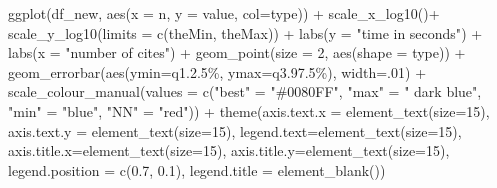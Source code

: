 \documentclass[
]{article}
\newenvironment{Shaded}{\begin{snugshade}}{\end{snugshade}}
\newcommand{\AttributeTok}[1]{\textcolor[rgb]{0.77,0.63,0.00}{#1}}
\newcommand{\DecValTok}[1]{\textcolor[rgb]{0.00,0.00,0.81}{#1}}
\newcommand{\FloatTok}[1]{\textcolor[rgb]{0.00,0.00,0.81}{#1}}
\newcommand{\FunctionTok}[1]{\textcolor[rgb]{0.00,0.00,0.00}{#1}}
\newcommand{\NormalTok}[1]{#1}
\newcommand{\OtherTok}[1]{\textcolor[rgb]{0.56,0.35,0.01}{#1}}
\newcommand{\SpecialCharTok}[1]{\textcolor[rgb]{0.00,0.00,0.00}{#1}}
\newcommand{\StringTok}[1]{\textcolor[rgb]{0.31,0.60,0.02}{#1}}
\begin{document}
\begin{Shaded}
\begin{Highlighting}[]
\FunctionTok{ggplot}\NormalTok{(df\_new, }\FunctionTok{aes}\NormalTok{(}\AttributeTok{x =}\NormalTok{ n, }\AttributeTok{y =}\NormalTok{ value, }\AttributeTok{col=}\NormalTok{type)) }\SpecialCharTok{+}  \FunctionTok{scale\_x\_log10}\NormalTok{()}\SpecialCharTok{+}
  \FunctionTok{scale\_y\_log10}\NormalTok{(}\AttributeTok{limits =} \FunctionTok{c}\NormalTok{(theMin, theMax))  }\SpecialCharTok{+}
  \FunctionTok{labs}\NormalTok{(}\AttributeTok{y =} \StringTok{"time in seconds"}\NormalTok{) }\SpecialCharTok{+}  \FunctionTok{labs}\NormalTok{(}\AttributeTok{x =} \StringTok{"number of cites"}\NormalTok{) }\SpecialCharTok{+}
  \FunctionTok{geom\_point}\NormalTok{(}\AttributeTok{size =} \DecValTok{2}\NormalTok{, }\FunctionTok{aes}\NormalTok{(}\AttributeTok{shape =}\NormalTok{ type)) }\SpecialCharTok{+}
  \FunctionTok{geom\_errorbar}\NormalTok{(}\FunctionTok{aes}\NormalTok{(}\AttributeTok{ymin=}\StringTok{\textasciigrave{}}\AttributeTok{q1.2.5\%}\StringTok{\textasciigrave{}}\NormalTok{, }\AttributeTok{ymax=}\StringTok{\textasciigrave{}}\AttributeTok{q3.97.5\%}\StringTok{\textasciigrave{}}\NormalTok{), }\AttributeTok{width=}\NormalTok{.}\DecValTok{01}\NormalTok{) }\SpecialCharTok{+}
  \FunctionTok{scale\_colour\_manual}\NormalTok{(}\AttributeTok{values =} \FunctionTok{c}\NormalTok{(}\StringTok{"best"} \OtherTok{=} \StringTok{"\#0080FF"}\NormalTok{,}
                                 \StringTok{"max"} \OtherTok{=} \StringTok{" dark blue"}\NormalTok{, }\StringTok{"min"} \OtherTok{=} \StringTok{"blue"}\NormalTok{, }\StringTok{"NN"} \OtherTok{=} \StringTok{"red"}\NormalTok{)) }\SpecialCharTok{+}
  \FunctionTok{theme}\NormalTok{(}\AttributeTok{axis.text.x =} \FunctionTok{element\_text}\NormalTok{(}\AttributeTok{size=}\DecValTok{15}\NormalTok{),}
        \AttributeTok{axis.text.y =} \FunctionTok{element\_text}\NormalTok{(}\AttributeTok{size=}\DecValTok{15}\NormalTok{),}
        \AttributeTok{legend.text=}\FunctionTok{element\_text}\NormalTok{(}\AttributeTok{size=}\DecValTok{15}\NormalTok{),}
        \AttributeTok{axis.title.x=}\FunctionTok{element\_text}\NormalTok{(}\AttributeTok{size=}\DecValTok{15}\NormalTok{),}
        \AttributeTok{axis.title.y=}\FunctionTok{element\_text}\NormalTok{(}\AttributeTok{size=}\DecValTok{15}\NormalTok{),}
        \AttributeTok{legend.position =} \FunctionTok{c}\NormalTok{(}\FloatTok{0.7}\NormalTok{, }\FloatTok{0.1}\NormalTok{),}
        \AttributeTok{legend.title =} \FunctionTok{element\_blank}\NormalTok{())}
\end{Highlighting}
\end{Shaded}
\end{document}
